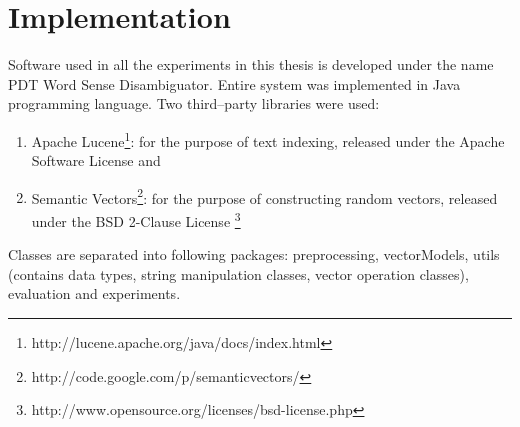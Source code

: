 \chapter{Implementation}
Software used in all the experiments in this thesis is developed under the name PDT Word Sense Disambiguator. Entire system was implemented in Java programming language. Two third--party libraries were used: 
\begin{enumerate}
\item Apache Lucene\footnote{http://lucene.apache.org/java/docs/index.html}: for the purpose of text indexing,  released under the Apache Software License and
\item Semantic Vectors\footnote{http://code.google.com/p/semanticvectors/}: for the purpose of constructing random vectors, released under the BSD 2-Clause License   \footnote{http://www.opensource.org/licenses/bsd-license.php}
\end{enumerate}
Classes are separated into following packages: preprocessing, vectorModels, utils (contains data types, string manipulation classes, vector operation classes), evaluation and experiments. 

